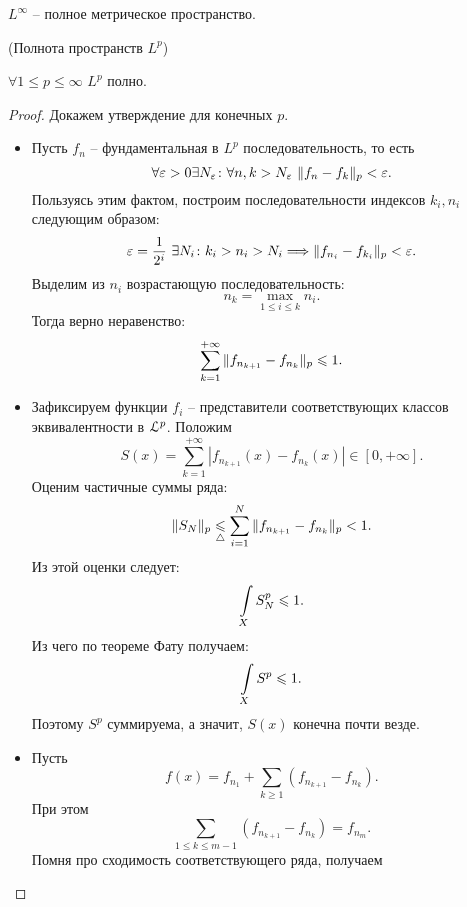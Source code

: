 \begin{remark}
    $L^{\infty}$ -- полное метрическое пространство.
\end{remark}

\begin{theorem}(Полнота пространств $L^p$)
    
    $\forall 1 \leqslant p \leqslant \infty$ $L^p$ полно.
\end{theorem}
\begin{proof}
    Докажем утверждение для конечных $p$. 
    \begin{itemize}
        \item Пусть $f_n$ -- фундаментальная в $L^p$ последовательность, то есть
            \[
                \forall \varepsilon > 0 \exists N_\varepsilon \colon \forall n, k > N_\varepsilon~
                \lVert f_n - f_k\rVert_p < \varepsilon
            .\]
            Пользуясь этим фактом, построим последовательности индексов
            $k_i, n_i$ следующим образом:
            \[
                \varepsilon = \frac{1}{2^i}~ \exists N_i \colon k_i > n_i > N_i \Longrightarrow
                \lVert f_{n_i} - f_{k_i}\rVert_p < \varepsilon
            .\]
            Выделим из $n_i$ возрастающую последовательность:
            \[
                n_k = \max_{1 \leqslant i \leqslant k}{n_i}
            .\]
            Тогда верно неравенство:
            \[
                \sum_{k = 1}^{+\infty}{\lVert f_{n_{k + 1}} - f_{n_k}\rVert_p} \leqslant 1
            .\]
        \item Зафиксируем функции $f_i$ -- представители соответствующих
            классов эквивалентности в $\mathcal{L}^p$. Положим
            \[
                S(x) = \sum_{k = 1}^{+\infty}{|f_{n_{k + 1}}(x) - f_{n_k}(x)|}
                \in [0, +\infty]
            .\]
            Оценим частичные суммы ряда:
            \[
                \lVert S_N\rVert_p \underset{\triangle}{\leqslant} \sum_{i = 1}^N
                {\lVert f_{n_{k + 1}} - f_{n_k}\rVert_p} < 1
            .\]
            Из этой оценки следует:
            \[
                \int\limits_X{S_N^p} \leqslant 1
            .\]
            Из чего по теореме Фату получаем:
            \[
                \int\limits_X{S^p} \leqslant 1
            .\]
            Поэтому $S^p$ суммируема, а значит, $S(x)$ конечна почти везде.
        \item Пусть
            \[
                f(x) = f_{n_1} + \sum_{k \geqslant 1}{(f_{n_{k + 1}} - f_{n_k})}
            .\]
            При этом
            \[
                \sum_{1 \leqslant k \leqslant m - 1}{(f_{n_{k + 1}} - f_{n_k})}
                = f_{n_m} 
            .\]
            Помня про сходимость соответствующего ряда, получаем

\end{itemize}
\end{proof}
